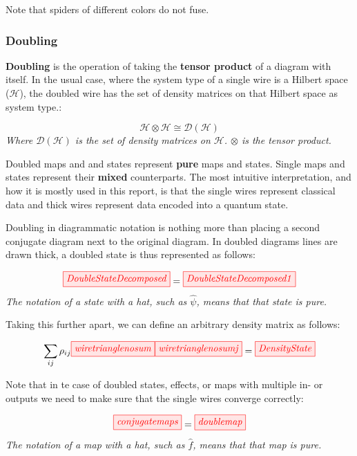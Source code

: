 \documentclass[]{article}
\begin{document}
Note that spiders of different colors do not fuse.

\subsubsection{Doubling}
\label{doubling}

\textbf{Doubling} is the operation of taking the \textbf{tensor product} of a diagram with itself. In the usual case, where the system type of a single wire is a Hilbert space ($\mathcal{H}$), the doubled wire has the set of density matrices on that Hilbert space as system type.:

\begin{equation}
\mathcal{H} \otimes \mathcal{H} \cong \mathcal{D}(\mathcal{H})
\end{equation}
\textit{Where $\mathcal{D}(\mathcal{H})$ is the set of density matrices on $\mathcal{H}$. $\otimes$ is the tensor product.}

Doubled maps and and states represent \textbf{pure} maps and states. Single maps and states represent their \textbf{mixed} counterparts. The most intuitive interpretation, and how it is mostly used in this report, is that the single wires represent classical data and thick wires represent data encoded into a quantum state.

Doubling in diagrammatic notation is nothing more than placing a second conjugate diagram next to the original diagram. In doubled diagrams lines are drawn thick, a doubled state is thus represented as follows:

\begin{equation}
	\tikzfig{DoubleStateDecomposed} = \tikzfig{DoubleStateDecomposed1}
\end{equation}
\textit{The notation of a state with a hat, such as $\hat{\psi}$, means that that state is pure.}

Taking this further apart, we can define an arbitrary density matrix as follows:

\begin{equation}
	 \sum\limits_{ij} \rho_{ij} \tikzfig{wiretrianglenosum} \tikzfig{wiretrianglenosumj} = \tikzfig{DensityState}
\end{equation}

Note that in te case of doubled states, effects, or maps with multiple in- or outputs we need to make sure that the single wires converge correctly:

\begin{equation}
\tikzfig{conjugatemaps} = \tikzfig{doublemap}
\end{equation}
\textit{The notation of a map with a hat, such as $\hat{f}$, means that that map is pure.}
\end{document}
